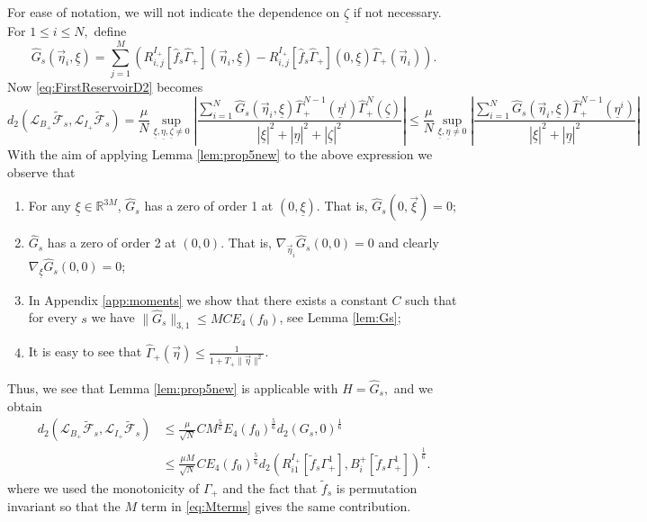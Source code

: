 \documentclass{article}
\newcommand{\scrF}{{\mathscr F}}
\newcommand*\R{ \mathds{R} }
\newcommand*\cL{ \mathcal{L} }
\newcommand\uxi{{\underline \xi}}
\newcommand\ueta{{\underline \eta}}
\newcommand\uzeta{{\underline \zeta}}
\newcommand\veta{{\vec \eta}}
\begin{document}
For ease of notation, we will not indicate the dependence on $\uzeta$ if not
necessary. For $1 \leq i \leq N,$ define
\begin{equation}\label{eq:HatGDef}
 \widehat G_s(\veta_i, \uxi) =
 \sum_{j = 1}^M \left(R^{I_+}_{i,j}[\hat f_{s}\widehat\Gamma_+](\veta_i, \uxi)
- R^{I_+}_{i,j}[\hat f_{s}\widehat\Gamma_+] (0,
\uxi)\widehat\Gamma_+(\veta_i)\right).
\end{equation}
Now \eqref{eq:FirstReservoirD2} becomes
\begin{equation}\label{eq:Mterms}
d_2(\cL_{B_+} \widetilde \scrF_s, \cL_{I_+} \widetilde \scrF_s) = 
\frac{\mu}{N} \sup_{\uxi,\ueta,\uzeta\not=0}\left| \frac{\sum_{i = 1}^{N}
\widehat G_{s}(\veta_i, \uxi)
\widehat\Gamma^{N-1}_+(\ueta^i)\widehat\Gamma^{N}_+(\uzeta)}
{|\uxi|^2 + |\ueta|^2 + |\uzeta|^2} \right|
\leq 
\frac{\mu}{N} \sup_{\uxi,\ueta\not=0}\left| \frac{\sum_{i = 1}^{N}  \widehat
G_{s}(\veta_i, \uxi) \widehat\Gamma^{N-1}_+(\ueta^i)}
{|\uxi|^2 + |\ueta|^2 } \right|
\end{equation}
With the aim of applying Lemma \ref{lem:prop5new} to the above expression we observe that
\begin{enumerate}
\item For any $\uxi \in \R^{3M}$, $\widehat G_s$ has a zero of order 1 at $(0,\uxi).$ That is, $\widehat G_s(0, 
\vec \xi) = 0$;

\item $\widehat G_s$ has a zero of order 2 at $(0, 0).$ That is,
$\nabla_{\veta_i} \widehat G_s(0, 0) = 0$ and clearly
$\nabla_{\uxi} \widehat G_s(0, 0) = 0$;

\item In Appendix \ref{app:moments} we show that there exists a constant $C$ such that for every $s$ we have
$\|\widehat G_s\|_{3,1}\leq M C E_4(f_0)$, see Lemma \ref{lem:Gs};
		
\item It is easy to see that $\widehat\Gamma_+(\veta)\leq\frac1{1+T_+\|\veta\|^2}$.
\end{enumerate}

Thus, we see that Lemma \ref{lem:prop5new} is applicable with $H =
\widehat G_s,$ and we obtain
\begin{equation}\label{eq:finfty}	
\begin{aligned}
d_2(\cL_{B_+}\widetilde \scrF_s, \cL_{I_+} \widetilde \scrF_s) &\leq
\frac{\mu}{\sqrt{N}}C M^{\frac56} E_4(f_0)^{\frac56}
d_2(G_s,0)^{\frac16}\\
&\leq \frac{\mu M}{\sqrt{N}}C E_ 4(f_0)^{\frac56}d_2\left(R_{i1}^{I_+} [\tilde
f_s \Gamma^1_+], B_i^+ [\tilde
f_s \Gamma^1_+]\right)^{\frac16}.
\end{aligned}
\end{equation}
where we used the monotonicity of $\Gamma_+$ and the fact that $\tilde f_s$ is permutation invariant so that the 
$M$ term in \eqref{eq:Mterms} gives the same contribution. 
\end{document}
